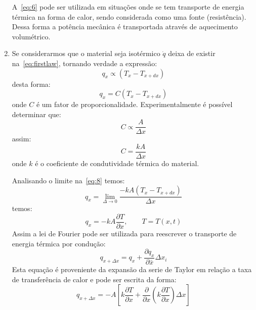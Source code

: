 \documentclass[
	12pt,				  %
	openright,		%
	twoside,			%
	a4paper,			%
	chapter=TITLE,		    %
	english,			%
	brazil				%
	]{abntex2}
\begin{document}
\begin{enumerate}
        A~\autoref{eq:6} pode ser utilizada em situações onde se tem transporte
        de energia térmica na forma de calor, sendo considerada como uma fonte
        (resistência). Dessa forma a potência mecânica é transportada através
        de aquecimento volumétrico.

    \item Se considerarmos que o material seja isotérmico $\dot{q}$ deixa de
        existir na~\autoref{eq:firstlaw}, tornando verdade a expressão:
        \begin{equation}
            q_x \propto (T_x - T_{x+dx})
        \end{equation}
        desta forma:
        \begin{equation}
            q_x = C(T_x - T_{x+dx})\label{eq:8}
        \end{equation}
        onde $C$ é um fator de proporcionalidade. Experimentalmente é possível
        determinar que:
        \begin{equation}
            C \propto \frac{A}{\Delta x}
        \end{equation}
        assim:
        \begin{equation}
            C = \frac{k A}{\Delta x}
        \end{equation}
        onde $k$ é o coeficiente de condutividade térmica do material.

        Analisando o limite na~\autoref{eq:8} temos:
        \begin{equation}
            q_x = \lim_{\Delta \to 0} \frac{-k A (T_x - T_{x + dx})}{\Delta x}
        \end{equation}
        temos:
        \begin{equation}
            q_x = -k A \frac{\partial T}{\partial x}, \qquad T = T(x,t)
        \end{equation}
        Assim a lei de Fourier pode ser utilizada para reescrever o transporte
        de energia térmica por condução:
        \begin{equation}
            q_{x + \Delta x} = q_x + \frac{\partial q_x}{\partial \bar{x}}
            \Delta x_i 
        \end{equation} 
        Esta equação é proveniente da expansão da serie de Taylor em relação a
        taxa de transferência de calor e pode ser escrita da forma:
        \begin{equation}
            q_{x+ \Delta x} = -A \left[ k \frac{\partial T}{\partial x} +
            \frac{\partial}{\partial x}\left( k \frac{\partial T}{\partial x}
            \right)\Delta x \right] \label{eq:14}
        \end{equation}
\end{enumerate}
\end{document}
